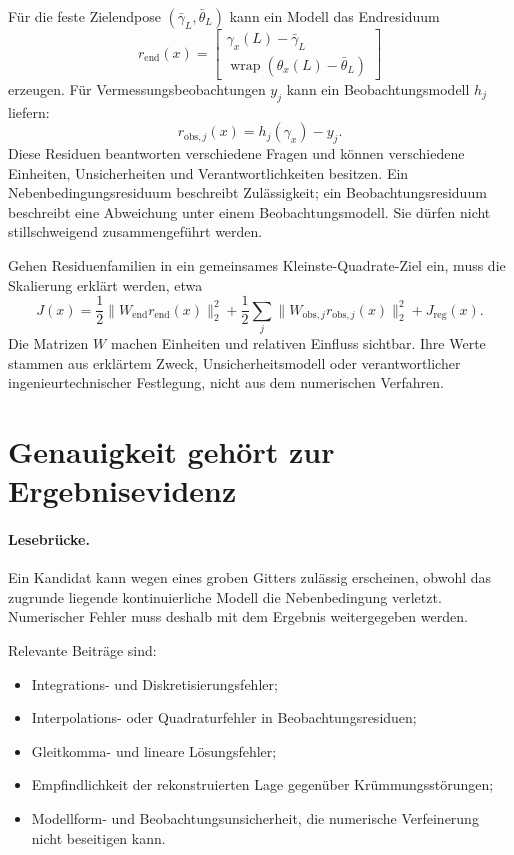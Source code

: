 Für die feste Zielendpose \((\bar\gamma_L,\bar\theta_L)\) kann ein Modell das
Endresiduum
\[
r_{\mathrm{end}}(x)=
\begin{bmatrix}
\gamma_x(L)-\bar\gamma_L\\
\operatorname{wrap}(\theta_x(L)-\bar\theta_L)
\end{bmatrix}
\]
erzeugen. Für Vermessungsbeobachtungen \(y_j\) kann ein Beobachtungsmodell
\(h_j\) liefern:
\[
r_{\mathrm{obs},j}(x)=h_j(\gamma_x)-y_j.
\]
Diese Residuen beantworten verschiedene Fragen und können verschiedene
Einheiten, Unsicherheiten und Verantwortlichkeiten besitzen. Ein
Nebenbedingungsresiduum beschreibt Zulässigkeit; ein Beobachtungsresiduum
beschreibt eine Abweichung unter einem Beobachtungsmodell. Sie dürfen nicht
stillschweigend zusammengeführt werden.

Gehen Residuenfamilien in ein gemeinsames Kleinste-Quadrate-Ziel ein, muss die
Skalierung erklärt werden, etwa
\[
J(x)=
\frac12\|W_{\mathrm{end}}r_{\mathrm{end}}(x)\|_2^2+
\frac12\sum_j
\|W_{\mathrm{obs},j}r_{\mathrm{obs},j}(x)\|_2^2+
J_{\mathrm{reg}}(x).
\]
Die Matrizen \(W\) machen Einheiten und relativen Einfluss sichtbar. Ihre
Werte stammen aus erklärtem Zweck, Unsicherheitsmodell oder verantwortlicher
ingenieurtechnischer Festlegung, nicht aus dem numerischen Verfahren.

\section{Genauigkeit gehört zur Ergebnisevidenz}

\paragraph{Lesebrücke.}
Ein Kandidat kann wegen eines groben Gitters zulässig erscheinen, obwohl das
zugrunde liegende kontinuierliche Modell die Nebenbedingung verletzt.
Numerischer Fehler muss deshalb mit dem Ergebnis weitergegeben werden.

Relevante Beiträge sind:
\begin{itemize}
\item Integrations- und Diskretisierungsfehler;
\item Interpolations- oder Quadraturfehler in Beobachtungsresiduen;
\item Gleitkomma- und lineare Lösungsfehler;
\item Empfindlichkeit der rekonstruierten Lage gegenüber
      Krümmungsstörungen;
\item Modellform- und Beobachtungsunsicherheit, die numerische Verfeinerung
      nicht beseitigen kann.
\end{itemize}


